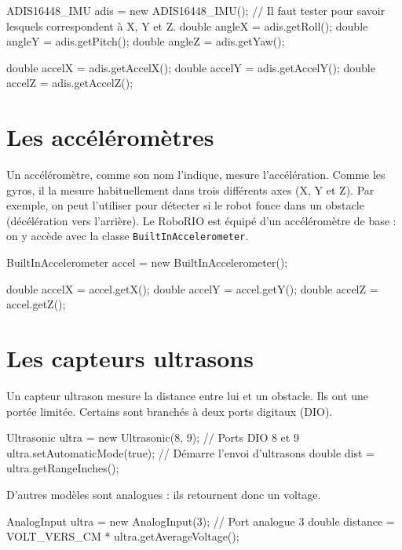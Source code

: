 \documentclass[12pt]{report}
\begin{document}
\begin{code}
ADIS16448_IMU adis = new ADIS16448_IMU();
// Il faut tester pour savoir lesquels correspondent à X, Y et Z.
double angleX = adis.getRoll();
double angleY = adis.getPitch();
double angleZ = adis.getYaw();

double accelX = adis.getAccelX();
double accelY = adis.getAccelY();
double accelZ = adis.getAccelZ();
\end{code}


\section{Les accéléromètres}

Un accéléromètre, comme son nom l'indique, mesure l'accélération. Comme les gyros, il la mesure habituellement dans trois différents axes (X, Y et Z). Par exemple, on peut l'utiliser pour détecter si le robot fonce dans un obstacle (décélération vers l'arrière). Le RoboRIO est équipé d'un accéléromètre de base : on y accède avec la classe \texttt{BuiltInAccelerometer}.

\begin{code}
BuiltInAccelerometer accel = new BuiltInAccelerometer();

double accelX = accel.getX();
double accelY = accel.getY();
double accelZ = accel.getZ();
\end{code}


\section{Les capteurs ultrasons}

Un capteur ultrason mesure la distance entre lui et un obstacle. Ils ont une portée limitée. Certains sont branchés à deux ports digitaux (DIO).

\begin{code}
Ultrasonic ultra = new Ultrasonic(8, 9); // Ports DIO 8 et 9
ultra.setAutomaticMode(true); // Démarre l'envoi d'ultrasons
double dist = ultra.getRangeInches();
\end{code}

D'autres modèles sont analogues : ils retournent donc un voltage.

\begin{code}
AnalogInput ultra = new AnalogInput(3); // Port analogue 3
double distance = VOLT_VERS_CM * ultra.getAverageVoltage();
\end{code}
\end{document}
